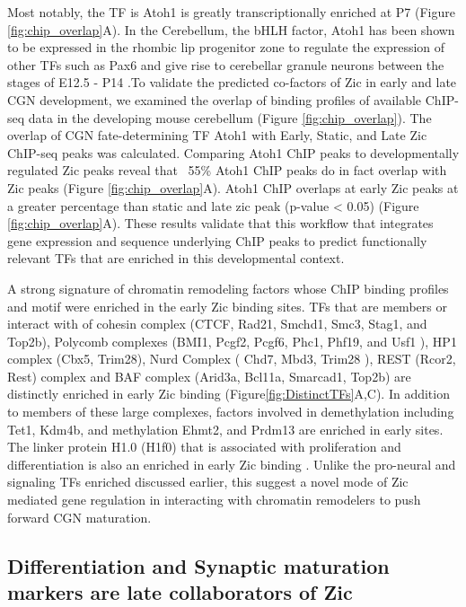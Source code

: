 \documentclass[fleqn,10pt]{wlscirep}
\begin{document}
Most notably, the TF is Atoh1 is greatly transcriptionally enriched at P7 (Figure \ref{fig:chip_overlap}A). In the Cerebellum, the bHLH factor, Atoh1 has been shown to be expressed in the rhombic lip progenitor zone to regulate the expression of other TFs such as Pax6 and give rise to cerebellar granule neurons between the stages of E12.5 - P14 \cite{Aruga2018ZicDisease, Yeung2014WlsDevelopment, Wang2005Math1Cerebellum, Ben-Arie1997Math1Neurons}.To validate the predicted co-factors of Zic in early and late CGN development, we examined the overlap of binding profiles of available ChIP-seq data in the developing mouse cerebellum  (Figure \ref{fig:chip_overlap}). The overlap of CGN fate-determining TF Atoh1 with Early, Static, and Late Zic ChIP-seq peaks was calculated. Comparing Atoh1 ChIP peaks to developmentally regulated Zic peaks reveal that ~55\%  Atoh1 ChIP peaks do in fact overlap with Zic peaks (Figure \ref{fig:chip_overlap}A). Atoh1 ChIP overlaps at early Zic peaks at a greater percentage than static and late zic peak (p-value < 0.05) (Figure \ref{fig:chip_overlap}A). These results validate that this workflow that integrates gene expression and sequence underlying ChIP peaks to predict functionally relevant TFs that are enriched in this developmental context.

A strong signature of chromatin remodeling factors whose ChIP binding profiles and motif were enriched in the early Zic binding sites. TFs that are members or interact with of cohesin complex  (CTCF, Rad21, Smchd1, Smc3, Stag1, and Top2b), Polycomb  complexes (BMI1, Pcgf2, Pcgf6, Phc1, Phf19, and Usf1 ), HP1 complex (Cbx5, Trim28), Nurd Complex ( Chd7, Mbd3, Trim28 ), REST (Rcor2, Rest) complex and BAF complex (Arid3a, Bcl11a, Smarcad1, Top2b) are distinctly enriched in early Zic binding (Figure\ref{fig:DistinctTFs}A,C). In addition to members of these large complexes, factors involved in demethylation including Tet1, Kdm4b, and methylation Ehmt2, and Prdm13 are enriched in early sites. The linker protein H1.0 (H1f0) that is associated with proliferation and differentiation is also an enriched in early Zic binding \cite{DiLiegro2018H1.0Differentiation}. Unlike the pro-neural and signaling TFs enriched discussed earlier, this suggest a novel mode of Zic mediated gene regulation in interacting with chromatin remodelers to push forward CGN maturation.

\subsection*{Differentiation and Synaptic maturation markers are late collaborators of Zic}
\end{document}
